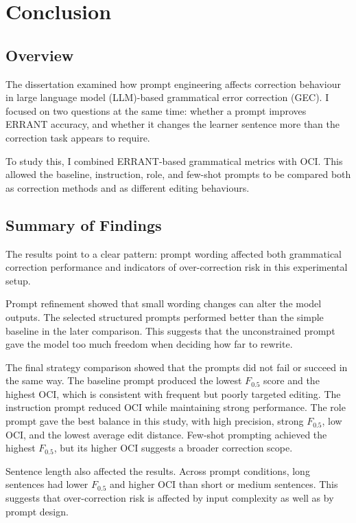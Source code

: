 \chapter{Conclusion}

\section{Overview}

The dissertation examined how prompt engineering affects correction behaviour in large language model (LLM)-based grammatical error correction (GEC). I focused on two questions at the same time: whether a prompt improves ERRANT accuracy, and whether it changes the learner sentence more than the correction task appears to require.

To study this, I combined ERRANT-based grammatical metrics with OCI. This allowed the baseline, instruction, role, and few-shot prompts to be compared both as correction methods and as different editing behaviours.

\section{Summary of Findings}

The results point to a clear pattern: prompt wording affected both grammatical correction performance and indicators of over-correction risk in this experimental setup.

Prompt refinement showed that small wording changes can alter the model outputs. The selected structured prompts performed better than the simple baseline in the later comparison. This suggests that the unconstrained prompt gave the model too much freedom when deciding how far to rewrite.

The final strategy comparison showed that the prompts did not fail or succeed in the same way. The baseline prompt produced the lowest $F_{0.5}$ score and the highest OCI, which is consistent with frequent but poorly targeted editing. The instruction prompt reduced OCI while maintaining strong performance. The role prompt gave the best balance in this study, with high precision, strong $F_{0.5}$, low OCI, and the lowest average edit distance. Few-shot prompting achieved the highest $F_{0.5}$, but its higher OCI suggests a broader correction scope.

Sentence length also affected the results. Across prompt conditions, long sentences had lower $F_{0.5}$ and higher OCI than short or medium sentences. This suggests that over-correction risk is affected by input complexity as well as by prompt design.


